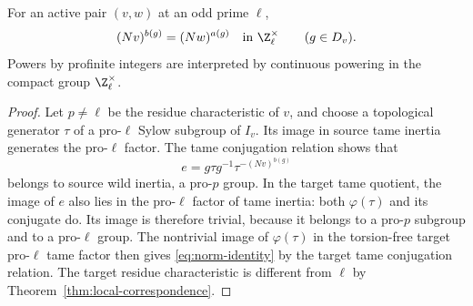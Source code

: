 \begin{lemma}\label{lem:norm-identity}
For an active pair $(v,w)$ at an odd prime $\ell$,
\begin{equation}\label{eq:norm-identity}
 (Nv)^{b(g)}=(Nw)^{a(g)}\quad\text{in }\Z_\ell^\times
 \qquad(g\in D_v).
\end{equation}
Powers by profinite integers are interpreted by continuous powering in the compact group $\Z_\ell^\times$.
\end{lemma}
\begin{proof}
Let $p\ne\ell$ be the residue characteristic of $v$, and choose a topological generator $\tau$ of a pro-$\ell$ Sylow subgroup of $I_v$. Its image in source tame inertia generates the pro-$\ell$ factor. The tame conjugation relation shows that
\[
 e=g\tau g^{-1}\tau^{-(Nv)^{b(g)}}
\]
belongs to source wild inertia, a pro-$p$ group. In the target tame quotient, the image of $e$ also lies in the pro-$\ell$ factor of tame inertia: both $\varphi(\tau)$ and its conjugate do. Its image is therefore trivial, because it belongs to a pro-$p$ subgroup and to a pro-$\ell$ group. The nontrivial image of $\varphi(\tau)$ in the torsion-free target pro-$\ell$ tame factor then gives \eqref{eq:norm-identity} by the target tame conjugation relation. The target residue characteristic is different from $\ell$ by Theorem~\ref{thm:local-correspondence}.
\end{proof}
